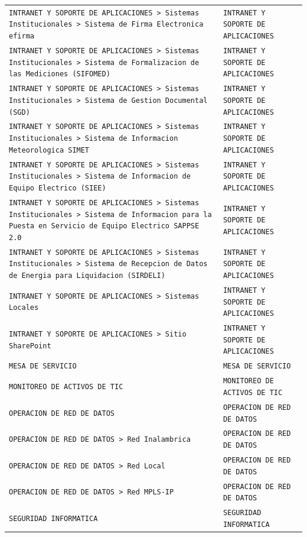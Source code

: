 \begin{longtable}{>{\raggedright\arraybackslash}p{} >{\raggedright\arraybackslash}p{}}
\texttt{INTRANET Y SOPORTE DE APLICACIONES > Sistemas Institucionales > Sistema de Firma Electronica efirma} & \texttt{INTRANET Y SOPORTE DE APLICACIONES} \\
\texttt{INTRANET Y SOPORTE DE APLICACIONES > Sistemas Institucionales > Sistema de Formalizacion de las Mediciones (SIFOMED)} & \texttt{INTRANET Y SOPORTE DE APLICACIONES} \\
\texttt{INTRANET Y SOPORTE DE APLICACIONES > Sistemas Institucionales > Sistema de Gestion Documental (SGD)} & \texttt{INTRANET Y SOPORTE DE APLICACIONES} \\
\texttt{INTRANET Y SOPORTE DE APLICACIONES > Sistemas Institucionales > Sistema de Informacion Meteorologica SIMET} & \texttt{INTRANET Y SOPORTE DE APLICACIONES} \\
\texttt{INTRANET Y SOPORTE DE APLICACIONES > Sistemas Institucionales > Sistema de Informacion de Equipo Electrico (SIEE)} & \texttt{INTRANET Y SOPORTE DE APLICACIONES} \\
\texttt{INTRANET Y SOPORTE DE APLICACIONES > Sistemas Institucionales > Sistema de Informacion para la Puesta en Servicio de Equipo Electrico SAPPSE 2.0} & \texttt{INTRANET Y SOPORTE DE APLICACIONES} \\
\texttt{INTRANET Y SOPORTE DE APLICACIONES > Sistemas Institucionales > Sistema de Recepcion de Datos de Energia para Liquidacion (SIRDELI)} & \texttt{INTRANET Y SOPORTE DE APLICACIONES} \\
\texttt{INTRANET Y SOPORTE DE APLICACIONES > Sistemas Locales} & \texttt{INTRANET Y SOPORTE DE APLICACIONES} \\
\texttt{INTRANET Y SOPORTE DE APLICACIONES > Sitio SharePoint} & \texttt{INTRANET Y SOPORTE DE APLICACIONES} \\
\texttt{MESA DE SERVICIO} & \texttt{MESA DE SERVICIO} \\
\texttt{MONITOREO DE ACTIVOS DE TIC} & \texttt{MONITOREO DE ACTIVOS DE TIC} \\
\texttt{OPERACION DE RED DE DATOS} & \texttt{OPERACION DE RED DE DATOS} \\
\texttt{OPERACION DE RED DE DATOS > Red Inalambrica} & \texttt{OPERACION DE RED DE DATOS} \\
\texttt{OPERACION DE RED DE DATOS > Red Local} & \texttt{OPERACION DE RED DE DATOS} \\
\texttt{OPERACION DE RED DE DATOS > Red MPLS-IP} & \texttt{OPERACION DE RED DE DATOS} \\
\texttt{SEGURIDAD INFORMATICA} & \texttt{SEGURIDAD INFORMATICA} \\

\end{longtable}
